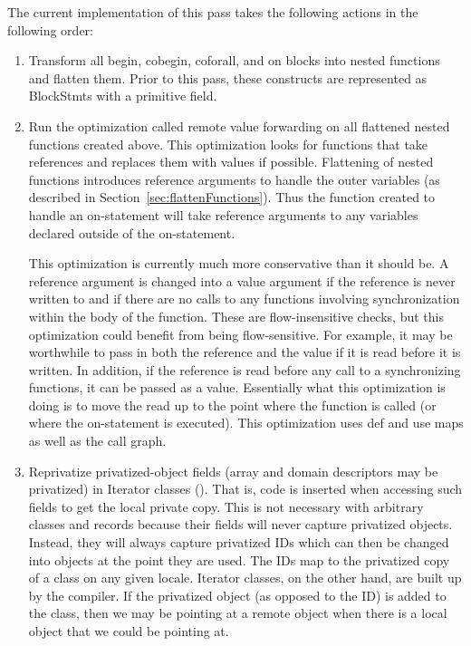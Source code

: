 \documentclass[10pt]{article}
\begin{document}
The current implementation of this pass takes the following actions in
the following order:
\begin{enumerate}
\item Transform all begin, cobegin, coforall, and on blocks into
  nested functions and flatten them.  Prior to this pass, these
  constructs are represented as BlockStmts with a primitive
   field.

\item Run the optimization called remote value forwarding on all
  flattened nested functions created above.  This optimization looks
  for functions that take references and replaces them with values if
  possible.  Flattening of nested functions introduces reference
  arguments to handle the outer variables (as described in
  Section~\ref{sec:flattenFunctions}).  Thus the function created to
  handle an on-statement will take reference arguments to any
  variables declared outside of the on-statement.  

  This optimization is currently much more conservative than it should
  be.  A reference argument is changed into a value argument if the
  reference is never written to and if there are no calls to any
  functions involving synchronization within the body of the function.
  These are flow-insensitive checks, but this optimization could
  benefit from being flow-sensitive.  For example, it may be
  worthwhile to pass in both the reference and the value if it is read
  before it is written.  In addition, if the reference is read before
  any call to a synchronizing functions, it can be passed as a value.
  Essentially what this optimization is doing is to move the read up
  to the point where the function is called (or where the on-statement
  is executed).  This optimization uses def and use maps as well as
  the call graph.

\item Reprivatize privatized-object fields (array and domain
  descriptors may be privatized) in Iterator classes
  ().  That is, code is inserted when
  accessing such fields to get the local private copy.  This is not
  necessary with arbitrary classes and records because their fields
  will never capture privatized objects.  Instead, they will always
  capture privatized IDs which can then be changed into objects at the
  point they are used.  The IDs map to the privatized copy of a class
  on any given locale.  Iterator classes, on the other hand, are built
  up by the compiler.  If the privatized object (as opposed to the ID)
  is added to the class, then we may be pointing at a remote object
  when there is a local object that we could be pointing at.


\end{enumerate}
\end{document}
